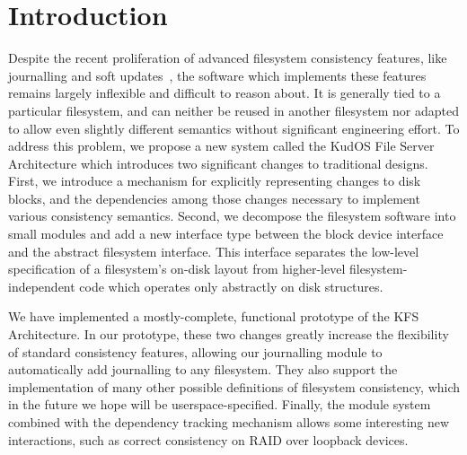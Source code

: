 \section*{Introduction}
\label{sec:intro}

Despite the recent proliferation of advanced filesystem consistency features,
like journalling and soft updates~\cite{ganger00soft}, the software which
implements these features remains largely inflexible and difficult to reason
about. It is generally tied to a particular filesystem, and can neither be
reused in another filesystem nor adapted to allow even slightly different
semantics without significant engineering effort. To address this problem, we
propose a new system called the KudOS File Server Architecture which introduces
two significant changes to traditional designs. First, we introduce a mechanism
for explicitly representing changes to disk blocks, and the dependencies among
those changes necessary to implement various consistency semantics. Second, we
decompose the filesystem software into small modules and add a new interface
type between the block device interface and the abstract filesystem interface.
This interface separates the low-level specification of a filesystem's on-disk
layout from higher-level filesystem-independent code which operates only
abstractly on disk structures.

We have implemented a mostly-complete, functional prototype of the KFS
Architecture. In our prototype, these two changes greatly increase the
flexibility of standard consistency features, allowing our journalling module to
automatically add journalling to any filesystem. They also support the
implementation of many other possible definitions of filesystem consistency,
which in the future we hope will be userspace-specified. Finally, the module
system combined with the dependency tracking mechanism allows some interesting
new interactions, such as correct consistency on RAID over loopback devices.
